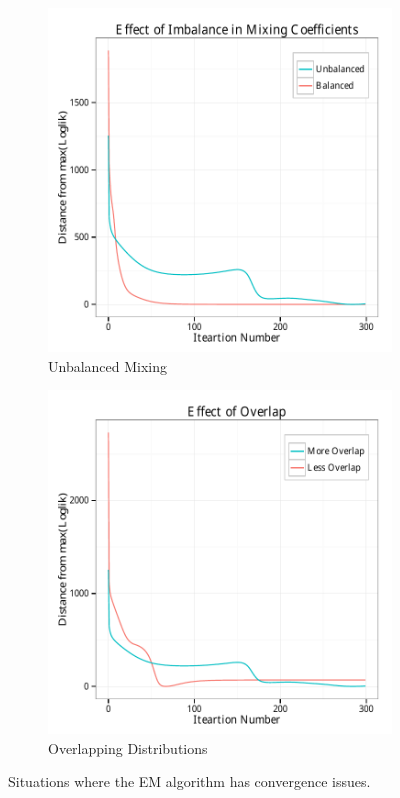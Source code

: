 \documentclass{article}
\theoremstyle{definition}
\theoremstyle{algodesc}
\begin{document}
\begin{figure}[htb] \centering
  \begin{subfigure}[t]{.45\linewidth}
    \includegraphics[width=\linewidth]{include/em_imbalance.pdf}
    \caption{Unbalanced Mixing} \label{fig:em_struggles_unbal}
  \end{subfigure}
  \begin{subfigure}[t]{.45\linewidth}
    \includegraphics[width=\linewidth]{include/em_overlap.pdf}
    \caption{Overlapping Distributions} \label{fig:em_struggles_overlap}
  \end{subfigure}
  \caption{Situations where the EM algorithm has convergence issues.}
  \label{fig:em_struggles}
\end{figure}
\end{document}
